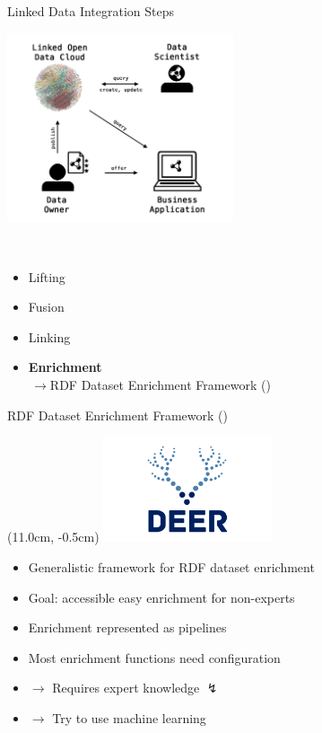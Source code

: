 \documentclass[aspectratio=1610,table]{beamer}
\def\<#1>{{\textsmaller{#1}}}
\begin{document}
\begin{frame}{Linked Data Integration Steps}
\begin{multicols}{2}
{\begin{center}
\includegraphics[width=0.5\textwidth]{gfx/flow}\end{center}}
{~~\smallskip
\begin{itemize}[<+->]
  \item Lifting
  \item Fusion
  \item Linking
  \item{ \textbf{Enrichment}\\$\,\to$RDF Dataset Enrichment Framework (\<DEER>)}
\end{itemize}}
\end{multicols}
\end{frame}


\begin{frame}{RDF Dataset Enrichment Framework (\<DEER>)}
\begin{textblock*}{5cm}(11.0cm, -0.5cm) %
\includegraphics[width=5cm]{gfx/deer}
\end{textblock*}
\begin{itemize}[<+->]
  \item Generalistic framework for RDF dataset enrichment
  \item Goal: accessible easy enrichment for non-experts  
  \item Enrichment represented as pipelines
  \item Most enrichment functions need configuration
  \item $\to$ Requires expert knowledge $\lightning$
  \item $\to$ Try to use machine learning
\end{itemize}
\end{frame}
\end{document}
